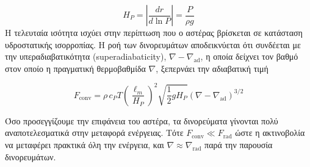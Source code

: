 \begin{equation}
    H_P = \left|\frac{dr}{d\ln P} \right| = \frac{P}{\rho g}
\end{equation}
Η τελευταία ισότητα ισχύει στην περίπτωση που ο αστέρας βρίσκεται σε κατάσταση υδροστατικής ισορροπίας. Η ροή των δινορευμάτων αποδεικνύεται ότι συνδέεται με την υπεραδιαβατικότητα (superadiabaticity), $\nabla - \nabla_{\text{ad}}$, η οποία δείχνει τον βαθμό στον οποίο η πραγματική θερμοβαθμίδα $\nabla$, ξεπερνάει την αδιαβατική τιμή

\begin{equation}
    F_{\text{conv}} = \rho \,c_P T \left( \frac{\ell_m}{H_P} \right)^2 \sqrt{\frac{1}{2} g H_P} \left(\nabla - \nabla_{\text{ad}} \right)^{3/2}
\end{equation}

Όσο προσεγγίζουμε την επιφάνεια του αστέρα, τα δινορεύματα γίνονται πολύ αναποτελεσματικά στην μεταφορά ενέργειας. Τότε $F_{\text{conv}} \ll F_{\text{rad}}$ ώστε η ακτινοβολία να μεταφέρει πρακτικά όλη την ενέργεια, και $\nabla \approx \nabla_{\text{rad}}$ παρά την παρουσία δινορευμάτων.
